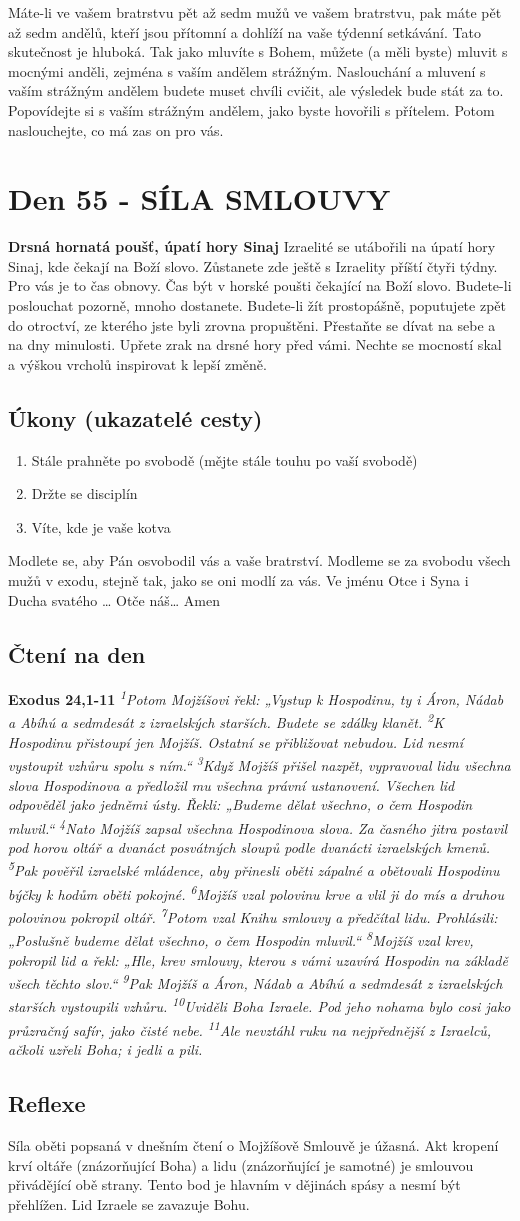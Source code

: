 \documentclass[11pt]{article}
\newcommand{\zacatekOsmyTyden}{
  \textbf{Drsná hornatá poušť, úpatí hory Sinaj} \newline 
  Izraelité se utábořili na úpatí hory Sinaj, kde čekají na Boží slovo. Zůstanete zde ještě s Izraelity příští čtyři týdny. Pro vás je to čas obnovy. Čas být v horské poušti čekající na Boží slovo. Budete-li poslouchat pozorně, mnoho dostanete. Budete-li žít prostopášně, poputujete zpět do otroctví, ze kterého jste byli zrovna propuštěni. Přestaňte se dívat na sebe a na dny minulosti. Upřete zrak na drsné hory před vámi. Nechte se mocností skal a výškou vrcholů inspirovat k lepší změně.
  \subsection*{Úkony (ukazatelé cesty)}
\begin{enumerate}
  \item Stále prahněte po svobodě (mějte stále touhu po vaší svobodě)
  \item Držte se disciplín
  \item Víte, kde je vaše kotva
\end{enumerate}
Modlete se, aby Pán osvobodil vás a vaše bratrství. \newline
Modleme se za svobodu všech mužů v exodu, stejně tak, jako se oni modlí za vás.\newline
Ve jménu Otce i Syna i Ducha svatého …  Otče náš… Amen
}
\begin{document}
Máte-li ve vašem bratrstvu pět až sedm mužů ve vašem bratrstvu, pak máte pět až sedm andělů, kteří jsou přítomní a
dohlíží na vaše týdenní setkávání. Tato skutečnost je hluboká. Tak jako mluvíte s Bohem, můžete (a měli byste) mluvit
s mocnými anděli, zejména s vaším andělem strážným. Naslouchání a mluvení s vaším strážným andělem budete muset
chvíli cvičit, ale výsledek bude stát za to. Popovídejte si s vaším strážným andělem, jako byste hovořili s přítelem.
Potom naslouchejte, co má zas on pro vás.

\newpage
\section{Den 55 - SÍLA SMLOUVY }
\zacatekOsmyTyden
\subsection*{Čtení na den}
\textbf{Exodus 24,1-11}
\newline
\textit{
\textsuperscript{1}Potom Mojžíšovi řekl: „Vystup k Hospodinu, ty i Áron, Nádab a Abíhú a sedmdesát z izraelských starších. Budete se zdálky klanět.
\textsuperscript{2}K Hospodinu přistoupí jen Mojžíš. Ostatní se přibližovat nebudou. Lid nesmí vystoupit vzhůru spolu s ním.“
\textsuperscript{3}Když Mojžíš přišel nazpět, vypravoval lidu všechna slova Hospodinova a předložil mu všechna právní ustanovení. Všechen lid odpověděl jako jedněmi ústy. Řekli: „Budeme dělat všechno, o čem Hospodin mluvil.“
\textsuperscript{4}Nato Mojžíš zapsal všechna Hospodinova slova. Za časného jitra postavil pod horou oltář a dvanáct posvátných sloupů podle dvanácti izraelských kmenů.
\textsuperscript{5}Pak pověřil izraelské mládence, aby přinesli oběti zápalné a obětovali Hospodinu býčky k hodům oběti pokojné.
\textsuperscript{6}Mojžíš vzal polovinu krve a vlil ji do mís a druhou polovinou pokropil oltář.
\textsuperscript{7}Potom vzal Knihu smlouvy a předčítal lidu. Prohlásili: „Poslušně budeme dělat všechno, o čem Hospodin mluvil.“
\textsuperscript{8}Mojžíš vzal krev, pokropil lid a řekl: „Hle, krev smlouvy, kterou s vámi uzavírá Hospodin na základě všech těchto slov.“
\textsuperscript{9}Pak Mojžíš a Áron, Nádab a Abíhú a sedmdesát z izraelských starších vystoupili vzhůru.
\textsuperscript{10}Uviděli Boha Izraele. Pod jeho nohama bylo cosi jako průzračný safír, jako čisté nebe.
\textsuperscript{11}Ale nevztáhl ruku na nejpřednější z Izraelců, ačkoli uzřeli Boha; i jedli a pili.
}

\subsection*{Reflexe}
Síla oběti popsaná v dnešním čtení o Mojžíšově Smlouvě je úžasná. Akt kropení krví oltáře (znázorňující
Boha) a lidu (znázorňující je samotné) je smlouvou přivádějící obě strany. Tento bod je hlavním v dějinách
spásy a nesmí být přehlížen. Lid Izraele se zavazuje Bohu.
\end{document}
